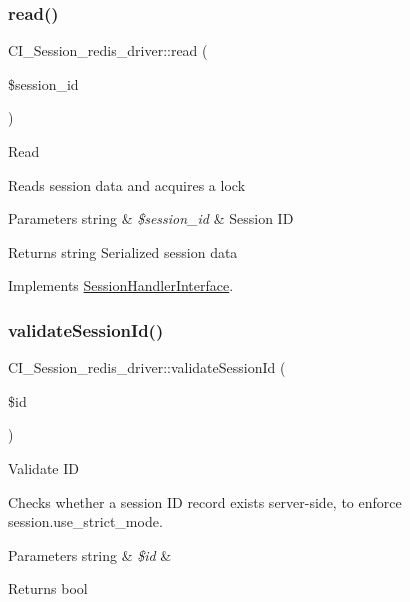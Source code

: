 \subsubsection{\texorpdfstring{read()}{read()}}
{\footnotesize\ttfamily C\+I\+\_\+\+Session\+\_\+redis\+\_\+driver\+::read (\begin{DoxyParamCaption}\item[{}]{\$session\+\_\+id }\end{DoxyParamCaption})}

Read

Reads session data and acquires a lock


\begin{DoxyParams}[1]{Parameters}
string & {\em \$session\+\_\+id} & Session ID \\
\hline
\end{DoxyParams}
\begin{DoxyReturn}{Returns}
string Serialized session data 
\end{DoxyReturn}


Implements \mbox{\hyperlink{interface_session_handler_interface}{Session\+Handler\+Interface}}.

\mbox{\label{class_c_i___session__redis__driver_ada12678b34075dd6553b72bfad91a761}} 
\subsubsection{\texorpdfstring{validate\+Session\+Id()}{validateSessionId()}}
{\footnotesize\ttfamily C\+I\+\_\+\+Session\+\_\+redis\+\_\+driver\+::validate\+Session\+Id (\begin{DoxyParamCaption}\item[{}]{\$id }\end{DoxyParamCaption})}

Validate ID

Checks whether a session ID record exists server-\/side, to enforce session.\+use\+\_\+strict\+\_\+mode.


\begin{DoxyParams}[1]{Parameters}
string & {\em \$id} & \\
\hline
\end{DoxyParams}
\begin{DoxyReturn}{Returns}
bool 
\end{DoxyReturn}
\mbox{\label{class_c_i___session__redis__driver_a08f684e434d6eeed20d446dfbeb7c3c8}} 
